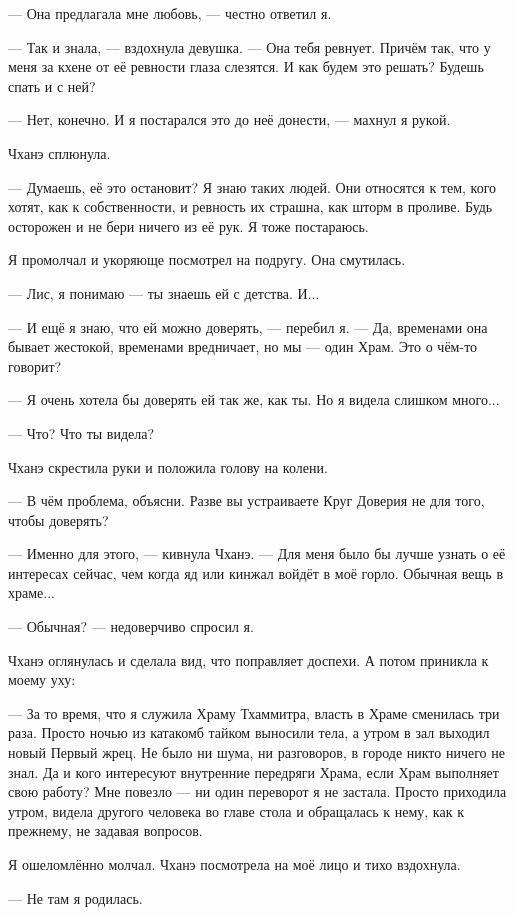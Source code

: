 --- Она предлагала мне любовь, --- честно ответил я.

--- Так и знала, --- вздохнула девушка.
--- Она тебя ревнует.
Причём так, что у меня за кхене от её ревности глаза слезятся.
И как будем это решать?
Будешь спать и с ней?

--- Нет, конечно.
И я постарался это до неё донести, --- махнул я рукой.

Чханэ сплюнула.

--- Думаешь, её это остановит?
Я знаю таких людей.
Они относятся к тем, кого хотят, как к собственности, и ревность их страшна, как шторм в проливе.
Будь осторожен и не бери ничего из её рук.
Я тоже постараюсь.

Я промолчал и укоряюще посмотрел на подругу.
Она смутилась.

--- Лис, я понимаю --- ты знаешь ей с детства.
И...

--- И ещё я знаю, что ей можно доверять, --- перебил я.
--- Да, временами она бывает жестокой, временами вредничает, но мы --- один Храм.
Это о чём-то говорит?

--- Я очень хотела бы доверять ей так же, как ты.
Но я видела слишком много...

--- Что?
Что ты видела?

Чханэ скрестила руки и положила голову на колени.

--- В чём проблема, объясни.
Разве вы устраиваете Круг Доверия не для того, чтобы доверять?

--- Именно для этого, --- кивнула Чханэ.
--- Для меня было бы лучше узнать о её интересах сейчас, чем когда яд или кинжал войдёт в моё горло.
Обычная вещь в храме...

--- Обычная? --- недоверчиво спросил я.

Чханэ оглянулась и сделала вид, что поправляет доспехи.
А потом приникла к моему уху:

--- За то время, что я служила Храму Тхаммитра, власть в Храме сменилась три раза.
Просто ночью из катакомб тайком выносили тела, а утром в зал выходил новый Первый жрец.
Не было ни шума, ни разговоров, в городе никто ничего не знал.
Да и кого интересуют внутренние передряги Храма, если Храм выполняет свою работу?
Мне повезло --- ни один переворот я не застала.
Просто приходила утром, видела другого человека во главе стола и обращалась к нему, как к прежнему, не задавая вопросов.

Я ошеломлённо молчал.
Чханэ посмотрела на моё лицо и тихо вздохнула.

--- Не там я родилась.

